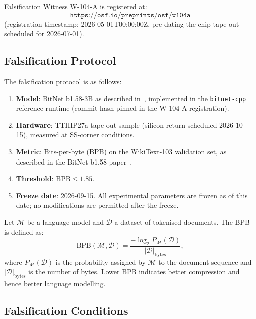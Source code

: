 Falsification Witness W-104-A is registered at:
\[
  \texttt{https://osf.io/preprints/osf/w104a}
\]
(registration timestamp: 2026-05-01T00:00:00Z, pre-dating the chip
tape-out scheduled for 2026-07-01).

\subsection{Falsification Protocol}
\label{subsec:falsification_protocol}

The falsification protocol is as follows:

\begin{enumerate}
  \item \textbf{Model}: BitNet b1.58-3B as described in~\cite{bitnet158},
        implemented in the \texttt{bitnet-cpp} reference runtime
        (commit hash pinned in the W-104-A registration).
  \item \textbf{Hardware}: TTIHP27a tape-out sample (silicon return
        scheduled 2026-10-15), measured at SS-corner conditions.
  \item \textbf{Metric}: Bits-per-byte (BPB) on the WikiText-103
        validation set, as described in the BitNet b1.58 paper~\cite{bitnet158}.
  \item \textbf{Threshold}: \(\mathrm{BPB} \leq 1.85\).
  \item \textbf{Freeze date}: 2026-09-15.  All experimental parameters
        are frozen as of this date; no modifications are permitted
        after the freeze.
\end{enumerate}

\begin{definition}
\label{def:bpb}
Let \(\mathcal{M}\) be a language model and \(\mathcal{D}\) a dataset
of tokenised documents.  The BPB is defined as:
\[
  \mathrm{BPB}(\mathcal{M}, \mathcal{D})
  = \frac{-\log_2 P_\mathcal{M}(\mathcal{D})}{|\mathcal{D}|_\mathrm{bytes}},
\]
where \(P_\mathcal{M}(\mathcal{D})\) is the probability assigned by
\(\mathcal{M}\) to the document sequence and
\(|\mathcal{D}|_\mathrm{bytes}\) is the number of bytes.  Lower BPB
indicates better compression and hence better language modelling.
\end{definition}

\subsection{Falsification Conditions}
\label{subsec:falsification_conditions}

